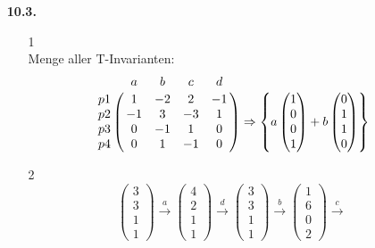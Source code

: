 \documentclass[a4paper,11pt,fleqn]{scrartcl}
\title{\titleinfo}
\author{\authorinfo}
\begin{document}
	\maketitle
	\begin{enumerate}
		\item[\textbf{10.3.}]
		\begin{enumerate}
			\item[1] \quad \\
				Menge aller T-Invarianten:
				\[
        		\bordermatrix{
       					   & a  & b  & c  & d  \cr
				        p1 & 1  & -2 & 2  & -1 \cr
        				p2 & -1 & 3  & -3 & 1  \cr
				        p3 & 0  & -1 & 1  & 0  \cr
				        p4 & 0  & 1  & -1 & 0  \cr}
				\Rightarrow
				\left\{ a
				\begin{pmatrix}
					1 \\ 0 \\ 0 \\ 1
				\end{pmatrix} + b
				\begin{pmatrix}
					0 \\ 1 \\ 1 \\ 0
				\end{pmatrix}
				\right\}
				\]
			\item[2] \quad \\
				\[
        		\begin{pmatrix}
        			3 \\ 3 \\ 1 \\ 1
        		\end{pmatrix} \overset{a}{\rightarrow}
        		\begin{pmatrix}
        			4 \\ 2 \\ 1 \\ 1
        		\end{pmatrix} \overset{d}{\rightarrow}
        		\begin{pmatrix}
        			3 \\ 3 \\ 1 \\ 1
        		\end{pmatrix} \overset{b}{\rightarrow}
        		\begin{pmatrix}
        			1 \\ 6 \\ 0 \\ 2
        		\end{pmatrix} \overset{c}{\rightarrow}
\]
\end{enumerate}
\end{enumerate}
\end{document}
